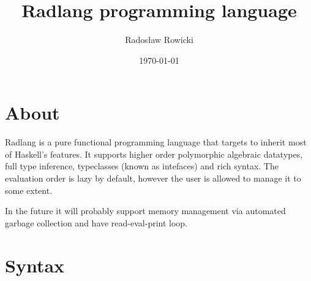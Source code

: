 \documentclass[11pt]{article}
\author{Radosław Rowicki}
\date{\today}
\title{Radlang programming language}
\begin{document}
\maketitle
\tableofcontents


\section{About}
\label{sec:org7422b0f}

Radlang is a pure functional programming language that targets to inherit most of Haskell's features. It supports higher order polymorphic algebraic datatypes, full type inference, typeclasses (known as intefaces) and rich syntax. The evaluation order is lazy by default, however the user is allowed to manage it to some extent.

In the future it will probably support memory management via automated garbage collection and have read-eval-print loop.

\section{Syntax}
\label{sec:org5386b3a}
\end{document}
